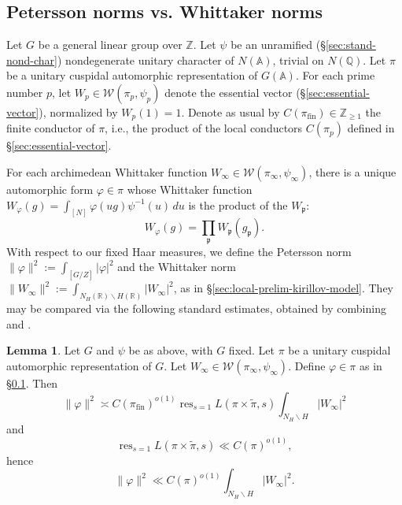 \documentclass[reqno]{amsart}
\DeclareMathOperator{\fin}{fin}
\DeclareMathOperator{\res}{res}
\theoremstyle{plain} \newtheorem{theorem} {Theorem}
\theoremstyle{definition} \newtheorem{definition} [theorem] {Definition}
\theoremstyle{itplain} %
\newtheorem{lemma}[theorem]{Lemma}
\numberwithin{equation}{section}
\numberwithin{theorem}{section}
\renewcommand{\geq}{\geqslant}
\begin{document}
\subsection{Petersson norms vs. Whittaker norms}\label{sec:norms-cusp-forms}
Let $G$ be a general linear group over $\mathbb{Z}$.  Let $\psi$ be an unramified (\S\ref{sec:stand-nond-char}) nondegenerate unitary character of $N(\mathbb{A})$, trivial on $N(\mathbb{Q})$.  Let $\pi$ be a unitary cuspidal automorphic representation of $G(\mathbb{A})$.  For each prime number $p$, let $W_p \in \mathcal{W}(\pi_p, \psi_p)$ denote the essential vector (\S\ref{sec:essential-vector}), normalized by $W_p(1) = 1$.  Denote as usual by $C(\pi_{\fin}) \in \mathbb{Z}_{\geq 1}$ the finite conductor of $\pi$, i.e., the product of the local conductors $C(\pi_p)$ defined in \S\ref{sec:essential-vector}.

For each archimedean Whittaker function $W_\infty \in \mathcal{W}(\pi_\infty, \psi_\infty)$, there is a unique automorphic form $\varphi \in \pi$ whose Whittaker function $W_\varphi(g) = \int_{[N]} \varphi(u g) \psi^{-1}(u) \, d u$ is the product of the $W_\mathfrak{p}$:
\begin{equation*}
  W_{\varphi}(g) = \prod_{\mathfrak{p}} W_{\mathfrak{p}}(g_\mathfrak{p}).
\end{equation*}
With respect to our fixed Haar measures, we define the Petersson norm $\|\varphi \|^2 := \int _{[G/Z]} |\varphi|^2$ and the Whittaker norm $\|W_\infty \|^2 := \int_{N_H(\mathbb{R}) \backslash H(\mathbb{R})} |W_\infty|^2$, as in \S\ref{sec:local-prelim-kirillov-model}.  They may be compared via the following standard estimates, obtained by combining \cite[\S7]{MR2200849} and \cite[\S1.3]{MR2595006}.

\begin{lemma}\label{lem:nonstandard-norm-whittaker}
  Let $G$ and $\psi$ be as above, with $G$ fixed.  Let $\pi$ be a unitary cuspidal automorphic representation of $G$.  Let $W_\infty \in \mathcal{W}(\pi_\infty, \psi_\infty)$.  Define $\varphi \in \pi$ as in \S\ref{sec:norms-cusp-forms}.  Then
  \begin{equation*}
    \|\varphi \|^2
    \asymp  C(\pi_{\fin})^{o(1)}
    \res_{s=1}L(\pi \times \tilde{\pi}, s)
    \int _{N_H \backslash H}
    |W_\infty|^2
  \end{equation*}
  and
  \begin{equation*}
    \res_{s=1}L(\pi \times \tilde{\pi}, s) \ll C(\pi)^{o(1)},
  \end{equation*}
  hence
  \begin{equation*}
    \|\varphi \|^2
    \ll C(\pi) ^{o(1)}
    \int _{N_H \backslash H}
    |W_\infty|^2.
  \end{equation*}
\end{lemma}
\end{document}
